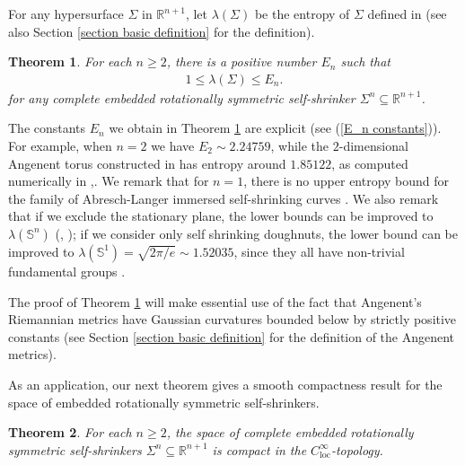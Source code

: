 \documentclass[12pt]{amsart}
\numberwithin{equation}{section}
\newtheorem{thm}{Theorem}[section]
\theoremstyle{remark}
\begin{document}
	For any hypersurface $\Sigma$ in $\mathbb R^{n+1}$, let $\lambda (\Sigma)$ be the entropy of $\Sigma$ defined in \cite{CM1} (see also Section \ref{section basic definition} for the definition). 
	
	\begin{thm} \label{upper bound on length}
		For each $n\ge 2$, there is a positive number $E_n$ such that 
		\begin{align*}
			1 \leq \lambda (\Sigma) \le E_n.
		\end{align*}
		for any complete embedded rotationally symmetric self-shrinker $\Sigma^n\subseteq\mathbb R^{n+1}$. 
	\end{thm}
	
	The constants $E_n$ we obtain in Theorem \ref{upper bound on length} are explicit (see (\ref{E_n constants})). For example, when $n=2$ we have $E_2 \sim 2.24759$, while the $2$-dimensional Angenent torus constructed in \cite{Ang} has entropy around $1.85122$, as computed numerically in \cite{yakov},\cite{HN}. We remark that for $n=1$, there is no upper entropy bound for the family of Abresch-Langer immersed self-shrinking curves \cite{AL}. We also remark that if we exclude the stationary plane, the lower bounds can be improved to $\lambda (\mathbb S^n)$ (\cite{CIMW}, \cite{BW}); if we consider only self shrinking doughnuts, the lower bound can be improved to $\lambda (\mathbb S^1) = \sqrt{2\pi/e} \sim 1.52035$, since they all have non-trivial fundamental groups \cite{HW}.
	
	The proof of Theorem \ref{upper bound on length} will make essential use of the fact that Angenent's Riemannian metrics have Gaussian curvatures bounded below by strictly positive constants (see Section \ref{section basic definition} for the definition of the Angenent metrics).
	
	As an application, our next theorem gives a smooth compactness result for the space of embedded rotationally symmetric self-shrinkers.
	
	\begin{thm} \label{smooth compactness}
		For each $n\ge 2$, the space of complete embedded rotationally symmetric self-shrinkers $\Sigma^n\subseteq\mathbb R^{n+1}$ is compact in the $C^\infty_\mathrm{loc}$-topology.
	\end{thm}
	
\end{document}
